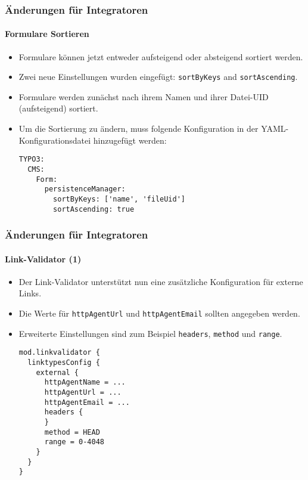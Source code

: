 \begin{frame}[fragile]
	\frametitle{Änderungen für Integratoren}
	\framesubtitle{Formulare Sortieren}

	\lstset{basicstyle=\tiny\ttfamily}

	\begin{itemize}
		\item Formulare können jetzt entweder aufsteigend oder absteigend sortiert werden.
		\item Zwei neue Einstellungen wurden eingefügt: \texttt{sortByKeys} and \texttt{sortAscending}.
		\item Formulare werden zunächst nach ihrem Namen und ihrer Datei-UID (aufsteigend) sortiert.
		\item Um die Sortierung zu ändern, muss folgende Konfiguration in der YAML-Konfigurationsdatei hinzugefügt werden:
\begin{lstlisting}
TYPO3:
  CMS:
    Form:
      persistenceManager:
        sortByKeys: ['name', 'fileUid']
        sortAscending: true
\end{lstlisting}

	\end{itemize}

\end{frame}


\begin{frame}[fragile]
	\frametitle{Änderungen für Integratoren}
	\framesubtitle{Link-Validator (1)}

	\lstset{basicstyle=\tiny\ttfamily}

	\begin{itemize}
		\item Der Link-Validator unterstützt nun eine zusätzliche Konfiguration für externe Links.
		\item Die Werte für \texttt{httpAgentUrl} und \texttt{httpAgentEmail} sollten angegeben werden.
		\item Erweiterte Einstellungen sind zum Beispiel \texttt{headers}, \texttt{method} und \texttt{range}.
\begin{lstlisting}
mod.linkvalidator {
  linktypesConfig {
    external {
      httpAgentName = ...
      httpAgentUrl = ...
      httpAgentEmail = ...
      headers {
      }
      method = HEAD
      range = 0-4048
    }
  }
}
\end{lstlisting}

	\end{itemize}

\end{frame}

